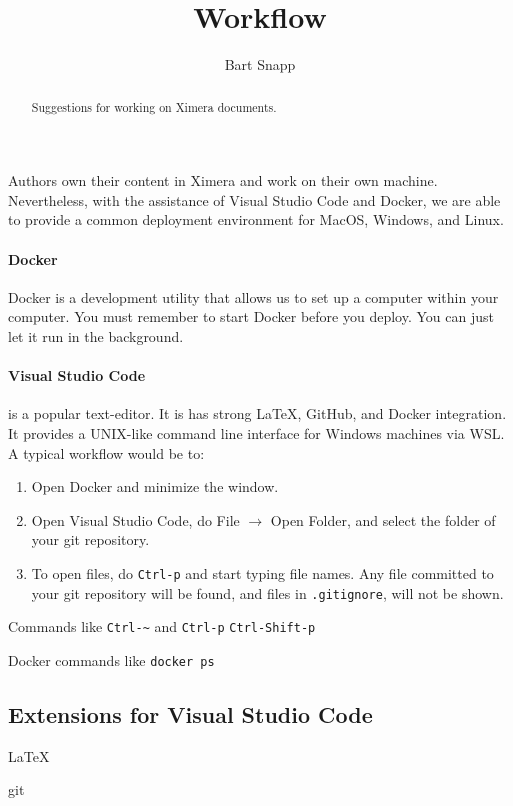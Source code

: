 \documentclass{ximera}
\title{Workflow}
\author{Bart Snapp}
\begin{document}
\begin{abstract}
    Suggestions for working on Ximera documents.
\end{abstract}
\maketitle

Authors own their content in Ximera and work on their own machine.
Nevertheless, with the assistance of Visual Studio Code and Docker, we are able
to provide a common deployment environment for MacOS, Windows, and Linux.

\paragraph{Docker}

Docker is a development utility that allows us to set up a computer within your
computer. You must remember to start Docker before you deploy. You can just let
it run in the background.

\paragraph{Visual Studio Code}
is a popular text-editor. It is has strong \LaTeX, GitHub,
and Docker integration. It provides a UNIX-like command line interface for
Windows machines via WSL. A typical workflow would be to:
\begin{enumerate}
    \item Open Docker and minimize the window.
    \item Open Visual Studio Code, do File $\to$ Open Folder, and select the
          folder of your git repository.
    \item To open files, do \verb!Ctrl-p! and start typing file names. Any file
          committed to your git repository will be found, and files in
          \verb!.gitignore!, will not be shown.
\end{enumerate}

Commands like \verb!Ctrl-~! and \verb!Ctrl-p! \verb!Ctrl-Shift-p!

Docker commands like
\verb!docker ps!

\subsection{Extensions for Visual Studio Code}

\LaTeX

git
\end{document}

